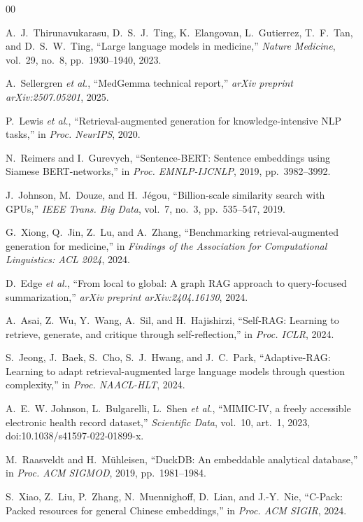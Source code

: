 \documentclass[conference]{IEEEtran}
\begin{document}
\begin{thebibliography}{00}

 A.~J.~Thirunavukarasu, D.~S.~J.~Ting, K.~Elangovan, L.~Gutierrez, T.~F.~Tan, and D.~S.~W.~Ting, ``Large language models in medicine,'' \textit{Nature Medicine}, vol.~29, no.~8, pp.~1930--1940, 2023.

 A.~Sellergren \textit{et al.}, ``MedGemma technical report,'' \textit{arXiv preprint arXiv:2507.05201}, 2025.

 P.~Lewis \textit{et al.}, ``Retrieval-augmented generation for knowledge-intensive NLP tasks,'' in \textit{Proc. NeurIPS}, 2020.

 N.~Reimers and I.~Gurevych, ``Sentence-BERT: Sentence embeddings using Siamese BERT-networks,'' in \textit{Proc. EMNLP-IJCNLP}, 2019, pp.~3982--3992.

 J.~Johnson, M.~Douze, and H.~J\'egou, ``Billion-scale similarity search with GPUs,'' \textit{IEEE Trans. Big Data}, vol.~7, no.~3, pp.~535--547, 2019.

 G.~Xiong, Q.~Jin, Z.~Lu, and A.~Zhang, ``Benchmarking retrieval-augmented generation for medicine,'' in \textit{Findings of the Association for Computational Linguistics: ACL 2024}, 2024.

 D.~Edge \textit{et al.}, ``From local to global: A graph RAG approach to query-focused summarization,'' \textit{arXiv preprint arXiv:2404.16130}, 2024.

 A.~Asai, Z.~Wu, Y.~Wang, A.~Sil, and H.~Hajishirzi, ``Self-RAG: Learning to retrieve, generate, and critique through self-reflection,'' in \textit{Proc. ICLR}, 2024.

 S.~Jeong, J.~Baek, S.~Cho, S.~J.~Hwang, and J.~C.~Park, ``Adaptive-RAG: Learning to adapt retrieval-augmented large language models through question complexity,'' in \textit{Proc. NAACL-HLT}, 2024.

 A.~E.~W. Johnson, L.~Bulgarelli, L.~Shen \textit{et al.}, ``MIMIC-IV, a freely accessible electronic health record dataset,'' \textit{Scientific Data}, vol.~10, art.~1, 2023, doi:10.1038/s41597-022-01899-x.

 M.~Raasveldt and H.~M\"uhleisen, ``DuckDB: An embeddable analytical database,'' in \textit{Proc. ACM SIGMOD}, 2019, pp.~1981--1984.

 S.~Xiao, Z.~Liu, P.~Zhang, N.~Muennighoff, D.~Lian, and J.-Y.~Nie, ``C-Pack: Packed resources for general Chinese embeddings,'' in \textit{Proc. ACM SIGIR}, 2024.


\end{thebibliography}
\end{document}
